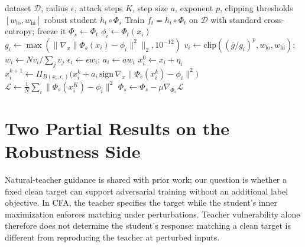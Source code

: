 \begin{algorithm}[h]
\caption{Clean Feature Anchoring (CFA)}
\label{alg:cfa}
\begin{algorithmic}[1]
 dataset $\mathcal{D}$, radius $\epsilon$, attack steps $K$, step size $a$,
  exponent $p$, clipping thresholds $[w_{\mathrm{lo}}, w_{\mathrm{hi}}]$
 robust student $h_t \circ \Phi_s$
\STATE
\STATE {}
\STATE Train $f_t = h_t \circ \Phi_t$ on $\mathcal{D}$ with standard cross-entropy; freeze it
\STATE
\STATE {}
\STATE $\Phi_s \leftarrow \Phi_t$ \hfill {}
    \STATE $\phi_i \leftarrow \Phi_t(x_i)$ \hfill {}
    \STATE $g_i \leftarrow \max(\lVert \nabla_x \lVert \Phi_s(x_i) - \phi_i \rVert^2 \rVert_2,10^{-12})$
      \hfill {}
    \STATE $v_i \leftarrow \mathrm{clip}((\bar g/g_i)^p,w_{\mathrm{lo}},w_{\mathrm{hi}})$;
      $w_i \leftarrow Nv_i/\sum_jv_j$
    \STATE $\epsilon_i \leftarrow \epsilon w_i$; $a_i\leftarrow a w_i$
      \hfill {}
    \STATE $x_i^{0} \leftarrow x_i + \eta_i$
      \STATE $x_i^{k+1} \leftarrow \Pi_{B(x_i, \epsilon_i)}
        \big( x_i^{k} + a_i\,\mathrm{sign}\,\nabla_x \lVert \Phi_s(x_i^{k}) - \phi_i \rVert^2 \big)$
    \ENDFOR
    \STATE $\mathcal{L} \leftarrow \frac{1}{N} \sum_i
      \lVert \Phi_s(x_i^{K}) - \phi_i \rVert^2$
    \STATE $\Phi_s \leftarrow \Phi_s - \mu \nabla_{\Phi_s} \mathcal{L}$
      \hfill {}
  \ENDFOR
\ENDFOR
\end{algorithmic}
\end{algorithm}

\section{Two Partial Results on the Robustness Side}
\label{app:robustness}

Natural-teacher guidance is shared with prior work; our question is whether a fixed clean target can
support adversarial training without an additional label objective. In CFA, the teacher specifies the
target while the student's inner maximization enforces matching under perturbations. Teacher
vulnerability alone therefore does not determine the student's response: matching a clean target
is different from reproducing the teacher at perturbed inputs.

